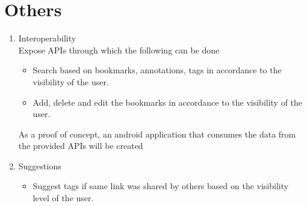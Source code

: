 \documentclass[11pt]{report} %
\begin{document}
\section{Others}
\begin{enumerate}
\item
Interoperability\\
Expose APIs through which the following can be done
\begin{itemize}
\item
Search based on bookmarks, annotations, tags in accordance to the visibility of the user.
\item
Add, delete and edit the bookmarks in accordance to the visibility of the user.
\end{itemize}
As a proof of concept, an android application that consumes the data from the provided APIs will be created
\item
Suggestions
\begin{itemize}
\item
Suggest tags if same link was shared by others based on the visibility level of the user.
\end{itemize}
\end{enumerate}
\end{document}
